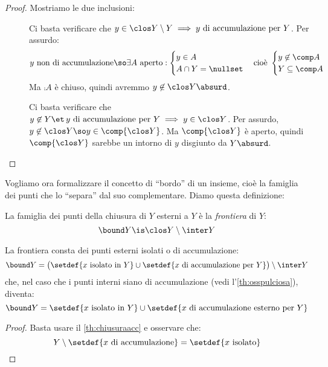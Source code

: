 \begin{proof}
	Mostriamo le due inclusioni:
	\begin{description}
		\item[\proofsubseteq]
		Ci basta verificare che $y\in\clos Y\setminus Y\implies y\text{ di accumulazione per }Y$.
		Per assurdo:
		\[y\text{ non di accumulazione}\so
		\exists A\text{ aperto}:
		\begin{cases}
			y\in A\\
			A\cap Y=\nullset
		\end{cases}\text{cioè }
		\begin{cases}
			y\not\in\comp A\\
			Y\subseteq\comp A
		\end{cases}\]
		Ma $\comp A$ è chiuso, quindi avremmo $y\not\in\clos Y\absurd$.
		\item[\proofsupseteq]
		Ci basta verificare che $y\not\in Y\et\, y\text{ di accumulazione per }Y\implies y\in\clos Y$.
		Per assurdo, $y\not\in\clos Y\so y\in\comp{\clos Y}$. Ma $\comp{\clos Y}$ è aperto, quindi $\comp{\clos Y}$ sarebbe un intorno di $y$ disgiunto da $Y\absurd$. \qedhere
	\end{description}
\end{proof}

Vogliamo ora formalizzare il concetto di ``bordo'' di un insieme, cioè la famiglia dei punti che lo ``separa'' dal suo complementare. Diamo questa definizione:

\begin{defn}[Frontiera]
	La famiglia dei punti della chiusura di $Y$ esterni a $Y$ è la \emph{frontiera} di $Y$:
	\[\bound Y\is\clos Y\setminus\inter Y\]
\end{defn}

\begin{prop}
	La frontiera consta dei punti esterni isolati o di accumulazione:
	\[\bound Y=\big(\setdef{x\text{ isolato in }Y}\cup\setdef{x\text{ di accumulazione per }Y}\big)\setminus\inter Y\]
	che, nel caso che i punti interni siano di accumulazione (vedi l'\autoref{th:osspulciosa}), diventa:
	\[\bound Y=\setdef{x\text{ isolato in }Y}\cup\setdef{x\text{ di accumulazione esterno per }Y}\]
\end{prop}

\begin{proof}
	Basta usare il \autoref{th:chiusuraacc} e osservare che:
	\[Y\setminus\setdef{x\text{ di accumulazione}}=\setdef{x\text{ isolato}} \qedhere\]
\end{proof}

